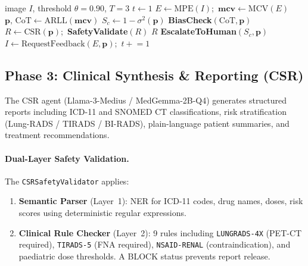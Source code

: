 \documentclass[10pt,twocolumn]{article}
\begin{document}
\begin{algorithm}[h]
  \caption{\texttt{\#wanna\#} Recursive Protocol}
  \label{alg:wanna}
  \begin{algorithmic}[1]
    \Require image $I$, threshold $\theta{=}0.90$, $T{=}3$
    \State $t \gets 1$
    \Repeat
      \State $E \gets \mathrm{MPE}(I)$;~$\mathbf{mcv} \gets \mathrm{MCV}(E)$
      \State $\mathbf{p},\,\mathrm{CoT} \gets \mathrm{ARLL}(\mathbf{mcv})$
      \State $S_c \gets 1 - \sigma^2(\mathbf{p})$
      \State \textbf{BiasCheck}$(\mathrm{CoT},\mathbf{p})$
        \State $R \gets \mathrm{CSR}(\mathbf{p})$;~\textbf{SafetyValidate}$(R)$
        \State \Return $R$
        \State \Return \textbf{EscalateToHuman}$(S_c,\mathbf{p})$
      \Else
        \State $I \gets \text{RequestFeedback}(E,\mathbf{p})$;~$t \mathrel{+}= 1$
      \EndIf
  \end{algorithmic}
\end{algorithm}

\subsection{Phase 3: Clinical Synthesis \& Reporting (CSR)}
\label{ssec:csr}

The CSR agent (Llama-3-Medius / MedGemma-2B-Q4) generates structured reports
including ICD-11 and SNOMED CT classifications, risk stratification (Lung-RADS /
TIRADS / BI-RADS), plain-language patient summaries, and treatment recommendations.

\paragraph{Dual-Layer Safety Validation.}
The \texttt{CSRSafetyValidator} applies:
\begin{enumerate}[noitemsep,leftmargin=*]
  \item \textbf{Semantic Parser} (Layer~1): NER for ICD-11 codes, drug names, doses,
    risk scores using deterministic regular expressions.
  \item \textbf{Clinical Rule Checker} (Layer~2): 9 rules including
    \texttt{LUNGRADS-4X} (PET-CT required), \texttt{TIRADS-5} (FNA required),
    \texttt{NSAID-RENAL} (contraindication), and paediatric dose thresholds.
    A BLOCK status prevents report release.
\end{enumerate}

\end{document}
